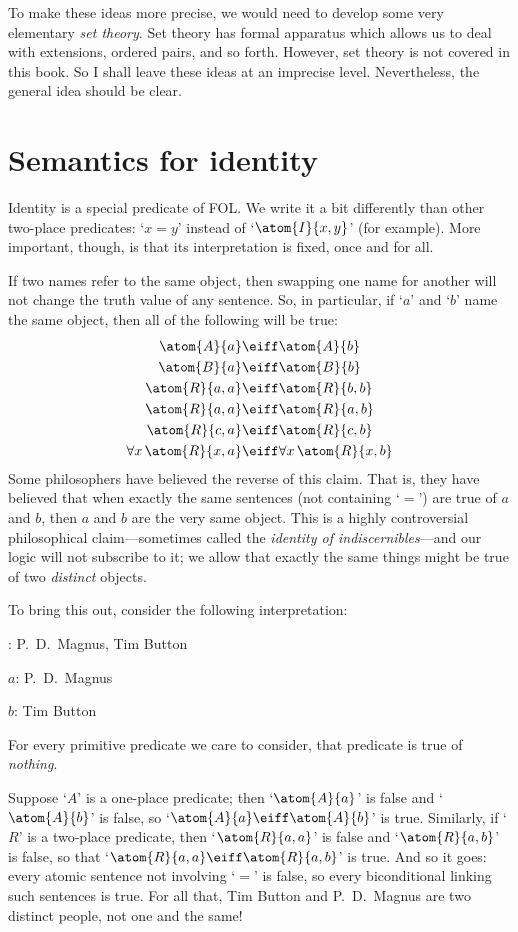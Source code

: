 To make these ideas more precise, we would need to develop some very elementary \emph{set theory}. Set theory has formal apparatus which allows us to deal with extensions, ordered pairs, and so forth. However, set theory is not covered in this book. So I shall leave these ideas at an imprecise level. Nevertheless, the general idea should be clear.


\section{Semantics for identity}
Identity is a special predicate of FOL. We write it a bit differently than other two-place predicates: `$x=y$' instead of `$\atom{I}{x,y}$' (for example). More important, though, is that its interpretation is fixed, once and for all.

If two names refer to the same object, then swapping one name for another will not change the truth value of any sentence. So, in particular, if `$a$' and `$b$' name the same object, then all of the following will be true:\label{model.nonidentity}
	\begin{align*}
	 	\atom{A}{a} &\eiff \atom{A}{b} \\
	 	\atom{B}{a} &\eiff \atom{B}{b}\\
		\atom{R}{a,a} &\eiff \atom{R}{b,b}\\
		\atom{R}{a,a} & \eiff \atom{R}{a,b}\\
		\atom{R}{c,a} &\eiff \atom{R}{c,b}\\
		\forall x\, \atom{R}{x,a} &\eiff \forall x\, \atom{R}{x,b}
	\end{align*}
Some philosophers have believed the reverse of this claim. That is, they have believed that when exactly the same sentences (not containing `$=$') are true of $a$ and $b$, then $a$ and $b$ are the very same object. This is a highly controversial philosophical claim---sometimes called the \emph{identity of indiscernibles}---and our logic will not subscribe to it; we allow that exactly the same things might be true of two \emph{distinct} objects.  

To bring this out, consider the following interpretation:
	\begin{ebullet}
		\item[\text{domain}:] P.~D.\ Magnus, Tim Button
		\item[$a$:] P.~D.\ Magnus
		\item[$b$:] Tim Button
		\item For every primitive predicate we care to consider, that predicate is true of \emph{nothing}.
	\end{ebullet}
Suppose `$A$' is a one-place predicate; then `$\atom{A}{a}$' is false and `$\atom{A}{b}$' is false, so `$\atom{A}{a} \eiff \atom{A}{b}$' is true. Similarly, if `$R$' is a two-place predicate, then `$\atom{R}{a,a}$' is false and `$\atom{R}{a,b}$' is false, so that `$\atom{R}{a,a} \eiff \atom{R}{a,b}$' is true. And so it goes: every atomic sentence not involving `$=$' is false, so every biconditional linking such sentences is true. For all that, Tim Button and P.~D.\ Magnus are two distinct people, not one and the same!

